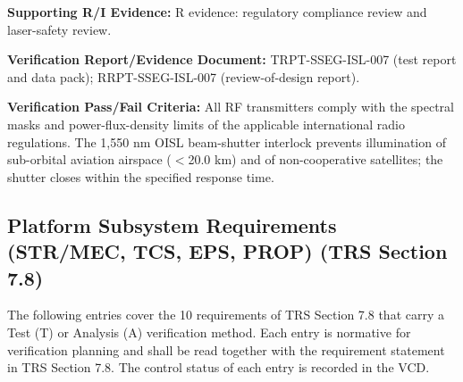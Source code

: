 \par\textbf{Supporting R/I Evidence:} R evidence: regulatory compliance review and laser-safety review.
\par\textbf{Verification Report/Evidence Document:} TRPT-SSEG-ISL-007 (test report and data pack); RRPT-SSEG-ISL-007 (review-of-design report).
\par\textbf{Verification Pass/Fail Criteria:} All RF transmitters comply with the spectral masks and power-flux-density limits of the applicable international radio regulations. The 1,550 nm OISL beam-shutter interlock prevents illumination of sub-orbital aviation airspace ($<$20.0 km) and of non-cooperative satellites; the shutter closes within the specified response time.
\par\medskip
\subsection{Platform Subsystem Requirements (STR/MEC, TCS, EPS, PROP) (TRS Section 7.8)}
The following entries cover the 10 requirements of TRS Section 7.8 that carry a Test (T) or Analysis (A) verification method. Each entry is normative for verification planning and shall be read together with the requirement statement in TRS Section 7.8. The control status of each entry is recorded in the VCD.
